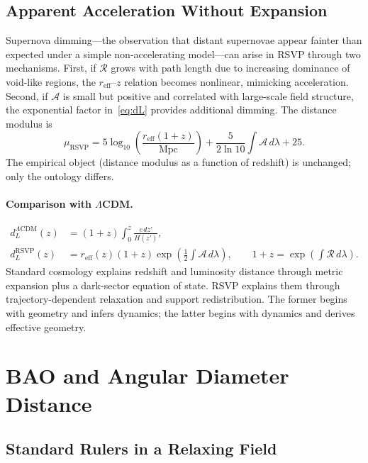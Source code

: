 \documentclass[12pt,a4paper]{article}
\theoremstyle{remark}
\newcommand{\Rcal}{\mathcal{R}}
\newcommand{\Acal}{\mathcal{A}}
\newcommand{\reff}{r_{\mathrm{eff}}}
\newcommand{\dL}{d_L^{\mathrm{RSVP}}}
\begin{document}
\subsection{Apparent Acceleration Without Expansion}

Supernova dimming---the observation that distant supernovae appear fainter than expected under a simple non-accelerating model---can arise in RSVP through two mechanisms. First, if $\Rcal$ grows with path length due to increasing dominance of void-like regions, the $\reff$--$z$ relation becomes nonlinear, mimicking acceleration. Second, if $\Acal$ is small but positive and correlated with large-scale field structure, the exponential factor in~\eqref{eq:dL} provides additional dimming. The distance modulus is
\begin{equation}
\mu_{\mathrm{RSVP}} = 5\log_{10}\!\left(\frac{\reff(1+z)}{\mathrm{Mpc}}\right) + \frac{5}{2\ln 10}\int\Acal\, d\lambda + 25.
\end{equation}
The empirical object (distance modulus as a function of redshift) is unchanged; only the ontology differs.

\paragraph{Comparison with $\Lambda$CDM.}
\begin{align}
d_L^{\Lambda\mathrm{CDM}}(z) &= (1+z)\int_0^z \frac{c\, dz'}{H(z')}, \\
\dL(z) &= \reff(z)(1+z)\exp\!\left(\tfrac12\int\Acal\, d\lambda\right),
\qquad 1+z = \exp\!\left(\int\Rcal\, d\lambda\right).
\end{align}
Standard cosmology explains redshift and luminosity distance through metric expansion plus a dark-sector equation of state. RSVP explains them through trajectory-dependent relaxation and support redistribution. The former begins with geometry and infers dynamics; the latter begins with dynamics and derives effective geometry.

\section{BAO and Angular Diameter Distance}
\label{sec:bao}

\subsection{Standard Rulers in a Relaxing Field}
\end{document}
